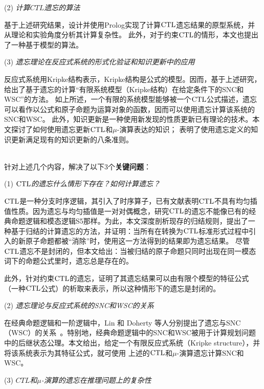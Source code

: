 (2) {\em 计算$CTL$遗忘的算法}

基于上述研究结果，设计并使用Prolog实现了计算$\textrm{CTL}$遗忘结果的原型系统，并从理论和实验角度分析其计算复杂性。
此外，对于约束$\textrm{CTL}$的情形，本文也提出了一种基于模型的算法。

(3) {\em 遗忘理论在反应式系统的形式化验证和知识更新中的应用}

反应式系统用Kripke结构表示，Kripke结构是公式的模型。因而，基于上述研究，
给出了基于遗忘的计算“有限系统模型（Kripke结构）在给定条件下的SNC和WSC”的方法。
如上所述，一个有限的系统模型能够被一个$\textrm{CTL}$公式描述，遗忘可以看作以公式和原子命题为运算对象的函数，因而可以使用遗忘计算该系统的SNC和WSC。
此外，知识更新是一种使用新发现的性质更新已有理论的技术。本文探讨了如何使用遗忘更新$\textrm{CTL}$和$\mu$-演算表达的知识；
表明了使用遗忘定义的知识更新满足现有的知识更新的八条准则。

~\\
针对上述几个内容，解决了以下3个\textbf{关键问题}：

(1) {\em $\textrm{CTL}$的遗忘什么情形下存在？如何计算遗忘？}

$\textrm{CTL}$是一种分支时序逻辑，其引入了时序算子，已有文献表明$\textrm{CTL}$不具有均匀插值性质。因为遗忘与均匀插值是一对对偶概念，研究$\textrm{CTL}$的遗忘不能像已有的经典命题逻辑和模态逻辑S5那样。为此，本文深度剖析现存的归结规则，提出了一种基于归结的计算遗忘的方法，并证明：当所有在转换为$\textrm{CTL}$标准形式过程中引入的新原子命题都被“消除”时，使用这一方法得到的结果即为遗忘结果。
尽管$\textrm{CTL}$遗忘不是封闭的，但本文给出：当被归结的原子命题只同时出现在同一模态词下的命题公式里时，遗忘总是存在的。

此外，针对约束$\textrm{CTL}$的遗忘，证明了其遗忘结果可以由有限个模型的特征公式（一种$\textrm{CTL}$公式）的析取来表示，所以这种情形下的遗忘是封闭的。

(2) {\em 遗忘理论与反应式系统的SNC和WSC的关系}

在经典命题逻辑和一阶逻辑中，Lin 和 Doherty 等人分别提出了遗忘与SNC（WSC）的关系~\cite{DBLP:journals/ai/Lin01,DBLP:conf/ijcai/DohertyLS01}。特别地，经典命题逻辑中的SNC和WSC被用于计算规划问题中的后继状态公理。本文给出，给定一个有限反应式系统（Kripke structure），并将该系统表示为其特征公式，就可使用
上述的$\textrm{CTL}$和$\mu$-演算遗忘计算SNC和WSC。



(3) {\em $CTL$和$\mu$-演算的遗忘在推理问题上的复杂性}

